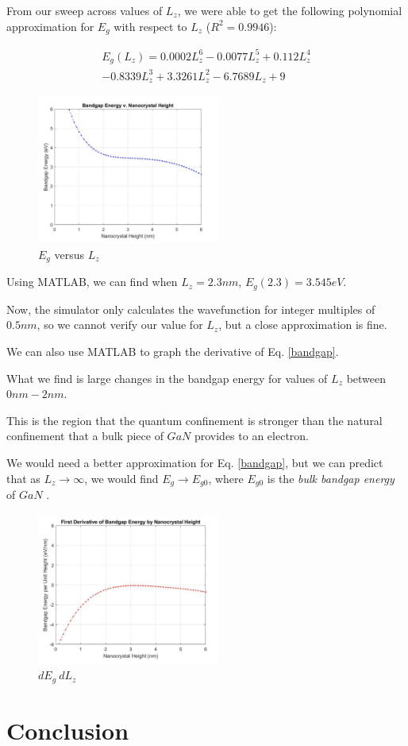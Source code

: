 \documentclass{IEEEtran}
\begin{document}
From our sweep across values of \(L_z\), we were able to get the following polynomial approximation for \(E_g\) with respect to \(L_z\) (\(R^2 = 0.9946\)):

\begin{multline} \label{bandgap}
    E_g(L_z) = 0.0002 L_z^6 - 0.0077 L_z^5 + 0.112 L_z^4 \\ - 0.8339 L_z^3 + 3.3261 L_z^2 - 6.7689 L_z + 9
\end{multline}

\begin{figure}[!h]
    \centering
    \includegraphics*[width = 6cm]{EgVLz.png}
    \caption{\(E_g\) versus \(L_z\)}
\end{figure}    

Using MATLAB, we can find when \(L_z = 2.3nm\), \(E_g(2.3) = 3.545eV\).

Now, the simulator only calculates the wavefunction for integer multiples of \(0.5nm\), so we cannot verify our value for \(L_z\), but a close approximation is fine. 


We can also use MATLAB to graph the derivative of Eq. \ref{bandgap}. 

What we find is large changes in the bandgap energy for values of \(L_z\) between \(0nm - 2nm\).

This is the region that the quantum confinement is stronger than the natural confinement that a bulk piece of \(GaN\) provides to an electron. 

We would need a better approximation for Eq. \ref{bandgap}, but we can predict that as \(L_z \to \infty\), we would find \(E_g \to E_{g0}\), where \(E_{g0}\) is the \textit{bulk bandgap energy} of \(GaN\) .

\begin{figure}[!h] \label{fig:derivative}
    \centering
    \includegraphics*[width = 6cm]{derivativeOfEgVLz.png}
    \caption{\(dE_g \ dL_z\)}
\end{figure}    





\section{Conclusion}



\end{document}
